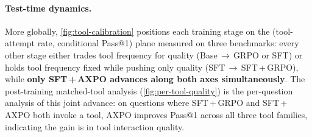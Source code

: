 \paragraph{Test-time dynamics.}
More globally, \autoref{fig:tool-calibration} positions each training stage on the (tool-attempt rate, conditional Pass@1) plane measured on three benchmarks: every other stage either trades tool frequency for quality (Base\,$\to$\,GRPO or SFT) or holds tool frequency fixed while pushing only quality (SFT\,$\to$\,SFT\,+\,GRPO), while \textbf{only SFT\,+\,AXPO advances along both axes simultaneously}. The post-training matched-tool analysis (\autoref{fig:per-tool-quality}) is the per-question analysis of this joint advance: on questions where SFT\,+\,GRPO and SFT\,+\,AXPO both invoke a tool, AXPO improves Pass@1 across all three tool families, indicating the gain is in tool interaction quality.